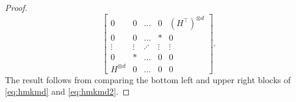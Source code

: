 \documentclass{article}
\theoremstyle{remark}
\theoremstyle{definition}
\begin{document}
\begin{proof}
\begin{equation}
        \begin{bmatrix} 
            0 & 0 & \ldots & 0 & (H^\top)^{\otimes d}\\
            0 & 0 & \ldots & * & 0\\
            \vdots & \vdots & \iddots & \vdots & \vdots \\
            0 & * & \ldots & 0 & 0\\
            H^{\otimes d} & 0 & \ldots & 0 & 0
        \end{bmatrix}.
        \label{eq:hmkmd2}
    \end{equation}
    The result follows from
    comparing the bottom left and upper right blocks of \eqref{eq:hmkmd} and \eqref{eq:hmkmd2}.
\end{proof}
 
\printbibliography
\end{document}
